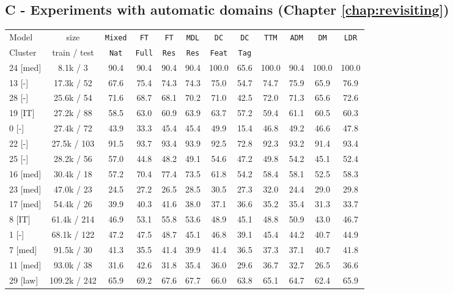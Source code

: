 \documentclass[12pt,a4paper,twoside]{report}
\theoremstyle{definition}
\newcommand{\system}[1]{\texttt{{#1}}}
\begin{document}
\subsection*{C - Experiments with automatic domains \label{ssec:full-automatic}(Chapter \ref{chap:revisiting})}

\begin{table*}[t]
  \centering
  \footnotesize
  \begin{tabular}{|p{1.3cm}|*{11}{c|}} \hline
   Model  & size&\system{Mixed}&\system{FT}&\system{FT}&\system{MDL}&\system{DC}&\system{DC}&\multirow{2}{*}{\system{TTM}}&\multirow{2}{*}{\system{ADM}}&\multirow{2}{*}{\system{DM}}&\multirow{2}{*}{\system{LDR}}  \\ 
   Cluster & train / test & \system{Nat} & \system{Full} & \system{Res} &\system{Res} & \system{Feat}& \system{Tag}& & & & \\ \hline
24 \hfill [med]&8.1k / 3 &90.4&90.4&90.4&90.4&100.0&65.6&100.0&90.4&100.0&100.0 \\
13 \hfill [-]&17.3k / 52&67.6&75.4&74.3&74.3&75.0&54.7&74.7&75.9&65.9&76.9 \\
28 \hfill [-]&25.6k / 54&71.6&68.7&68.1&70.2&71.0&42.5&72.0&71.3&65.6&72.6 \\
19 \hfill [IT]&27.2k / 88&58.5&63.0&60.9&63.9&63.7&57.2&59.4&61.1&60.5&60.3 \\
0   \hfill [-]&27.4k / 72&43.9&33.3&45.4&45.4&49.9&15.4&46.8&49.2&46.6&47.8 \\
22 \hfill [-]&27.5k / 103&91.5&93.7&93.4&93.9&92.5&72.8&92.3&93.2&91.4&93.4 \\
25 \hfill [-]&28.2k / 56&57.0&44.8&48.2&49.1&54.6&47.2&49.8&54.2&45.1&52.4 \\
16 \hfill [med]&30.4k / 18&57.2&70.4&77.4&73.5&61.8&54.2&58.4&58.1&52.5&58.3 \\
23 \hfill [med]&47.0k / 23&24.5&27.2&26.5&28.5&30.5&27.3&32.0&24.4&29.0&29.8 \\
17 \hfill [med]&54.4k / 26&39.9&40.3&41.6&38.0&37.1&36.6&35.2&35.4&31.3&33.7 \\
8  \hfill [IT]&61.4k / 214&46.9&53.1&55.8&53.6&48.9&45.1&48.8&50.9&43.0&46.7 \\
1 \hfill [-]&68.1k / 122&47.2&47.5&48.7&45.1&46.8&39.1&45.4&44.2&40.7&44.9 \\
7 \hfill [med]&91.5k / 30&41.3&35.5&41.4&39.9&41.4&36.5&37.3&37.1&40.7&41.8 \\
11 \hfill [med]&93.0k / 38&31.6&42.6&31.8&35.4&36.0&29.6&36.7&32.7&26.5&36.6 \\
29 \hfill [law]&109.2k / 242&65.9&69.2&67.6&67.7&66.0&63.8&65.1&64.7&62.4&65.9 \\

\end{tabular}
\end{table*}
\end{document}
